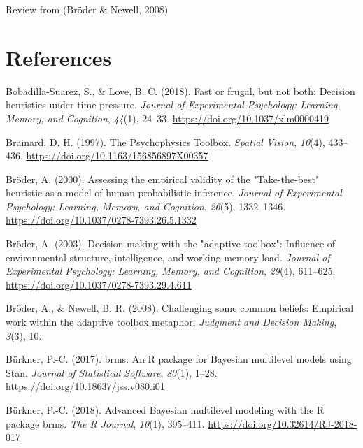 \documentclass[
  english,
  man]{apa6}
\newlength{\cslhangindent}
\newenvironment{cslreferences}%
  {\setlength{\parindent}{0pt}%
  \everypar{\setlength{\hangindent}{\cslhangindent}}\ignorespaces}%
  {\par}
\begin{document}
Review from (Bröder \& Newell, 2008)

\hypertarget{references}{%
\section{References}\label{references}}

\begingroup
\setlength{\parindent}{-0.5in}
\setlength{\leftskip}{0.5in}

\hypertarget{refs}{}
\begin{cslreferences}
\leavevmode\hypertarget{ref-bobadilla-suarezFastFrugalNot2018}{}%
Bobadilla-Suarez, S., \& Love, B. C. (2018). Fast or frugal, but not both: Decision heuristics under time pressure. \emph{Journal of Experimental Psychology: Learning, Memory, and Cognition}, \emph{44}(1), 24--33. \url{https://doi.org/10.1037/xlm0000419}

\leavevmode\hypertarget{ref-brainard_psychophysics_1997}{}%
Brainard, D. H. (1997). The Psychophysics Toolbox. \emph{Spatial Vision}, \emph{10}(4), 433--436. \url{https://doi.org/10.1163/156856897X00357}

\leavevmode\hypertarget{ref-broderAssessingEmpiricalValidity2000}{}%
Bröder, A. (2000). Assessing the empirical validity of the "Take-the-best" heuristic as a model of human probabilistic inference. \emph{Journal of Experimental Psychology: Learning, Memory, and Cognition}, \emph{26}(5), 1332--1346. \url{https://doi.org/10.1037/0278-7393.26.5.1332}

\leavevmode\hypertarget{ref-broderDecisionMakingAdaptive2003}{}%
Bröder, A. (2003). Decision making with the "adaptive toolbox": Influence of environmental structure, intelligence, and working memory load. \emph{Journal of Experimental Psychology: Learning, Memory, and Cognition}, \emph{29}(4), 611--625. \url{https://doi.org/10.1037/0278-7393.29.4.611}

\leavevmode\hypertarget{ref-broderChallengingCommonBeliefs2008}{}%
Bröder, A., \& Newell, B. R. (2008). Challenging some common beliefs: Empirical work within the adaptive toolbox metaphor. \emph{Judgment and Decision Making}, \emph{3}(3), 10.

\leavevmode\hypertarget{ref-R-brms_a}{}%
Bürkner, P.-C. (2017). brms: An R package for Bayesian multilevel models using Stan. \emph{Journal of Statistical Software}, \emph{80}(1), 1--28. \url{https://doi.org/10.18637/jss.v080.i01}

\leavevmode\hypertarget{ref-R-brms_b}{}%
Bürkner, P.-C. (2018). Advanced Bayesian multilevel modeling with the R package brms. \emph{The R Journal}, \emph{10}(1), 395--411. \url{https://doi.org/10.32614/RJ-2018-017}


\end{cslreferences}
\end{document}
